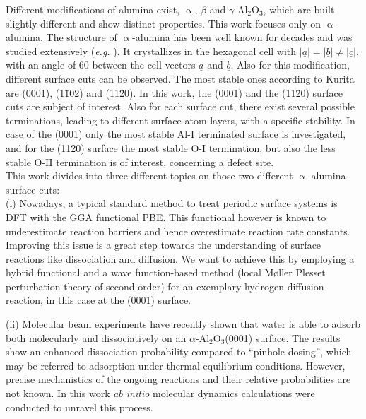 \documentclass[11pt,DIV=13,BCOR=5mm,a4paper,headinclude]{scrbook}
\renewcommand{\vec}[1]{\underline{#1}}
\begin{document}
Different modifications of alumina exist, $\upalpha$, $\beta$ and $\gamma$-Al$_2$O$_3$, which are built slightly different and show distinct properties.
This work focuses only on $\upalpha$-alumina.
The structure of $\upalpha$-alumina has been well known for decades and was studied extensively (\textit{e.g.} \cite{Passerini1930,wyckoff1931}).
It crystallizes in the hexagonal cell with $|\vec{a}|=|\vec{b}|\neq |\vec{c}|$, with an angle of $60$\textdegree{} between the cell vectors $\vec{a}$ and $\vec{b}$.
Also for this modification, different surface cuts can be observed. 
The most stable ones according to Kurita\cite{kuri10} are (0001), (1\=102) and (11\=20).
In this work, the (0001) and the (11\=20) surface cuts are subject of interest.
Also for each surface cut, there exist several possible terminations, leading to different surface atom layers, with a specific stability.
In case of the (0001) only the most stable Al-I terminated surface is investigated, and for the (11\=20) surface the most stable O-I termination, but also the less stable O-II termination is of interest, concerning a defect site.
\\

This work divides into three different topics on those two different $\upalpha$-alumina surface cuts:\\
(i) Nowadays, a typical standard method to treat periodic surface systems is DFT with the GGA functional PBE.
This functional however is known to underestimate reaction barriers and hence overestimate reaction rate constants.
Improving this issue is a great step towards the understanding of surface reactions like dissociation and diffusion.
We want to achieve this by employing a hybrid functional and a wave function-based method (local M\o{}ller Plesset perturbation theory of second order) for an exemplary hydrogen diffusion reaction, in this case at the (0001) surface.


(ii) Molecular beam experiments have recently shown that water is able to adsorb both molecularly and dissociatively on an $\alpha$-Al$_{\text{2}}$O$_{\text{3}}$(0001) surface\cite{Wirth2014}.
The results show an enhanced dissociation probability compared to ``pinhole dosing'', which may be referred to adsorption under thermal equilibrium conditions.
However, precise mechanistics of the ongoing reactions  and their relative probabilities are not known.
In this work \textit{ab initio} molecular dynamics calculations were conducted to unravel this process.
\end{document}
